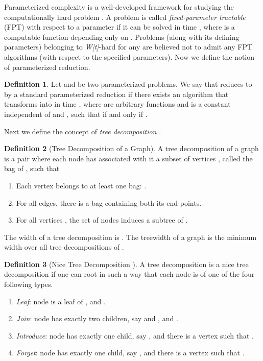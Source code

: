 \documentclass[a4paper,11pt]{article}
\theoremstyle{definition}
\newtheorem{definition}{Definition}
\begin{document}
\smallskip

Parameterized complexity is a well-developed framework for studying the computationally hard problem \cite{RGDMRF99,JFMG06,RN06}. A problem is called {\it fixed-parameter tractable} (FPT) with respect to a parameter  if it can be solved in time , where  is a computable function depending only on . Problems (along with its defining parameters) belonging to {\it W[t]}-hard for any  are believed not to admit any FPT algorithms (with respect to the specified parameters). Now we define the notion of parameterized reduction.

\begin{definition}
Let  and  be two parameterized problems. We say that  reduces to  by a standard parameterized reduction if there exists an algorithm  that transforms  into  in time , where  are arbitrary functions and  is a constant independent of  and , such that  if and only if .
\end{definition}

Next we define the concept of {\em tree decomposition} \cite{HLBAMCAK08,DBLP:books/sp/Kloks94}.

\begin{definition}[Tree Decomposition of a Graph]
A tree decomposition of a graph  is a pair  where each node  has associated with it a subset of vertices , called the bag of , such that
\begin{enumerate}
    \item{Each vertex belongs to at least one bag: .}
    \item{For all edges, there is a bag containing both its end-points.}
    \item{For all vertices , the set of nodes  induces a subtree of .}
\end{enumerate}
\end{definition}

The width of a tree decomposition is . The treewidth of a graph  is the minimum width over all tree decompositions of .

\begin{definition}[Nice Tree Decomposition \cite{DBLP:books/sp/Kloks94}]
A tree decomposition  is a nice tree decomposition if one can root  in such a way that each node  is of one of the four following types.
\begin{enumerate}
    \item{{\em Leaf}: node  is a leaf of , and .}
    \item{{\em Join}: node  has exactly two children, say  and , and .}
    \item{{\em Introduce}: node  has exactly one child, say , and there is a vertex  such that .}
    \item{{\em Forget}: node  has exactly one child, say , and there is a vertex  such that .}
\end{enumerate}
\end{definition}
\end{document}
